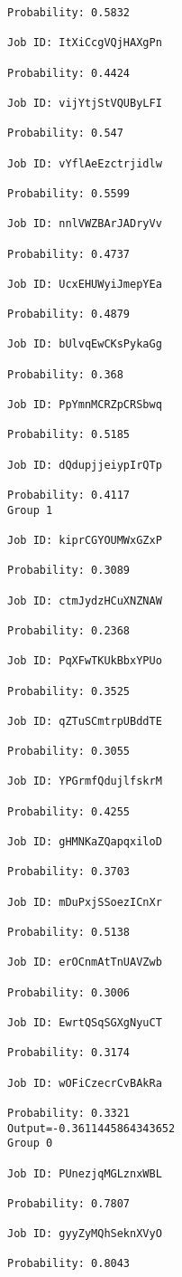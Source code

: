\documentclass[11pt]{article}
\begin{document}
\begin{Verbatim}[commandchars=\\\{\}]
Probability: 0.5832

Job ID: ItXiCcgVQjHAXgPn

Probability: 0.4424

Job ID: vijYtjStVQUByLFI

Probability: 0.547

Job ID: vYflAeEzctrjidlw

Probability: 0.5599

Job ID: nnlVWZBArJADryVv

Probability: 0.4737

Job ID: UcxEHUWyiJmepYEa

Probability: 0.4879

Job ID: bUlvqEwCKsPykaGg

Probability: 0.368

Job ID: PpYmnMCRZpCRSbwq

Probability: 0.5185

Job ID: dQdupjjeiypIrQTp

Probability: 0.4117
Group 1

Job ID: kiprCGYOUMWxGZxP

Probability: 0.3089

Job ID: ctmJydzHCuXNZNAW

Probability: 0.2368

Job ID: PqXFwTKUkBbxYPUo

Probability: 0.3525

Job ID: qZTuSCmtrpUBddTE

Probability: 0.3055

Job ID: YPGrmfQdujlfskrM

Probability: 0.4255

Job ID: gHMNKaZQapqxiloD

Probability: 0.3703

Job ID: mDuPxjSSoezICnXr

Probability: 0.5138

Job ID: erOCnmAtTnUAVZwb

Probability: 0.3006

Job ID: EwrtQSqSGXgNyuCT

Probability: 0.3174

Job ID: wOFiCzecrCvBAkRa

Probability: 0.3321
Output=-0.3611445864343652
Group 0

Job ID: PUnezjqMGLznxWBL

Probability: 0.7807

Job ID: gyyZyMQhSeknXVyO

Probability: 0.8043


\end{Verbatim}
\end{document}
